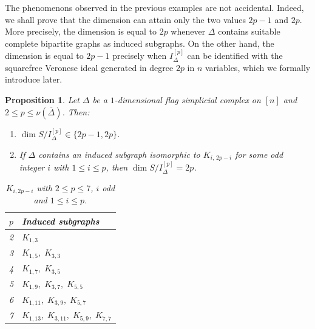 \documentclass[12pt]{amsart}
\newtheorem{Proposition}[Theorem]{Proposition}
\begin{document}
The phenomenons observed in the previous examples are not accidental. Indeed, we shall prove that the dimension can attain only the two values $2p-1$ and $2p$. More precisely, the dimension is equal to $2p$ whenever $\Delta$ contains suitable complete bipartite graphs as induced subgraphs. On the other hand, the dimension is equal to $2p-1$ precisely when $I_{\Delta}^{[p]}$ can be identified with the squarefree Veronese ideal generated in degree $2p$ in $n$ variables, which we formally introduce later.

\begin{Proposition}\label{Thm: dimension}
Let $\Delta$ be a $1$-dimensional flag simplicial complex on $[n]$ and $2\leq p\leq \nu(\overline{\Delta})$. Then:
\begin{enumerate}
\item $\dim S/I_{\Delta}^{[p]}\in \{2p-1,2p\}$.
\item If $\Delta$ contains an induced subgraph isomorphic to $K_{i,\,2p-i}$ for some odd integer $i$ with $1 \le i \le p$, then $\dim S/I_{\Delta}^{[p]} = 2p$.
\end{enumerate}

\begin{table}[h]
\centering
\begin{tabular}{c|l}
$p$ & Induced subgraphs \\ \hline
2 & $K_{1,3}$ \\
3 & $K_{1,5},\; K_{3,3}$ \\
4 & $K_{1,7},\; K_{3,5}$ \\
5 & $K_{1,9},\; K_{3,7},\; K_{5,5}$ \\
6 & $K_{1,11},\; K_{3,9},\; K_{5,7}$ \\
7 & $K_{1,13},\; K_{3,11},\; K_{5,9},\; K_{7,7}$
\end{tabular}
\caption{$K_{i,2p-i}$ with $2\leq p\leq 7$, $i$ odd and $1 \le i \le p$.}
\end{table}
\end{Proposition}
\end{document}
